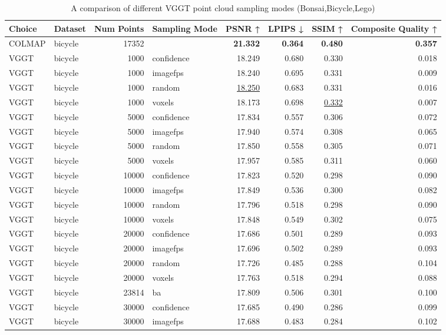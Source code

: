 \begin{table}[H]
\caption{A comparison of different VGGT point cloud sampling modes (Bonsai,Bicycle,Lego)}
\label{tab:03_sampling_mode_bonsai,bicycle,lego}
\small
\begin{tabular}{llrlrrrr}
\toprule
Choice & Dataset & Num Points & Sampling Mode & PSNR ↑ & LPIPS ↓ & SSIM ↑ & Composite Quality ↑ \\
\midrule
COLMAP & bicycle & 17352 &  & \textbf{21.332} & \textbf{0.364} & \textbf{0.480} & \textbf{0.357} \\
VGGT & bicycle & 1000 & confidence & 18.249 & 0.680 & 0.330 & 0.018 \\
VGGT & bicycle & 1000 & imagefps & 18.240 & 0.695 & 0.331 & 0.009 \\
VGGT & bicycle & 1000 & random & \underline{18.250} & 0.683 & 0.331 & 0.016 \\
VGGT & bicycle & 1000 & voxels & 18.173 & 0.698 & \underline{0.332} & 0.007 \\
VGGT & bicycle & 5000 & confidence & 17.834 & 0.557 & 0.306 & 0.072 \\
VGGT & bicycle & 5000 & imagefps & 17.940 & 0.574 & 0.308 & 0.065 \\
VGGT & bicycle & 5000 & random & 17.850 & 0.558 & 0.305 & 0.071 \\
VGGT & bicycle & 5000 & voxels & 17.957 & 0.585 & 0.311 & 0.060 \\
VGGT & bicycle & 10000 & confidence & 17.823 & 0.520 & 0.298 & 0.090 \\
VGGT & bicycle & 10000 & imagefps & 17.849 & 0.536 & 0.300 & 0.082 \\
VGGT & bicycle & 10000 & random & 17.796 & 0.518 & 0.298 & 0.090 \\
VGGT & bicycle & 10000 & voxels & 17.848 & 0.549 & 0.302 & 0.075 \\
VGGT & bicycle & 20000 & confidence & 17.686 & 0.501 & 0.289 & 0.093 \\
VGGT & bicycle & 20000 & imagefps & 17.696 & 0.502 & 0.289 & 0.093 \\
VGGT & bicycle & 20000 & random & 17.726 & 0.485 & 0.288 & 0.104 \\
VGGT & bicycle & 20000 & voxels & 17.763 & 0.518 & 0.294 & 0.088 \\
VGGT & bicycle & 23814 & ba & 17.809 & 0.506 & 0.301 & 0.100 \\
VGGT & bicycle & 30000 & confidence & 17.685 & 0.490 & 0.286 & 0.099 \\
VGGT & bicycle & 30000 & imagefps & 17.688 & 0.483 & 0.284 & 0.102 \\

\end{tabular}
\end{table}
